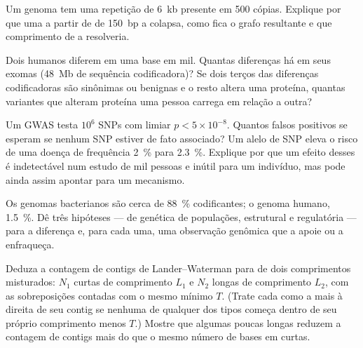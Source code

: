 \begin{exercise}[$\star\star$]\label{exo:b3:genomics:7}
Um genoma tem uma repetição de \qty{6}{kb} presente em \num{500}
cópias. Explique por que uma  a partir de  de
\qty{150}{bp} a colapsa, como fica o grafo resultante e que comprimento
de  a resolveria.
\end{exercise}

\begin{exercise}[$\star\star$]\label{exo:b3:genomics:8}
Dois humanos diferem em uma base em mil. Quantas diferenças há em seus
exomas (\qty{48}{Mb} de sequência codificadora)? Se dois terços das
diferenças codificadoras são sinônimas ou benignas e o resto altera
uma proteína, quantas variantes que alteram proteína uma pessoa
carrega em relação a outra?
\end{exercise}

\begin{exercise}[$\star\star$]\label{exo:b3:genomics:9}
Um GWAS testa $10^{6}$ SNPs com limiar $p < 5\times 10^{-8}$. Quantos
falsos positivos se esperam se nenhum SNP estiver de fato associado?
Um alelo de SNP eleva o risco de uma doença de frequência \qty{2}{\%}
para \qty{2.3}{\%}. Explique por que um efeito desses é indetectável
num estudo de mil pessoas e inútil para um indivíduo, mas pode ainda
assim apontar para um mecanismo.
\end{exercise}

\begin{exercise}[$\star\star\star$]\label{exo:b3:genomics:10}
Os genomas bacterianos são cerca de \qty{88}{\%} codificantes; o
genoma humano, \qty{1.5}{\%}. Dê três hipóteses --- de genética de
populações, estrutural e regulatória --- para a diferença e, para cada
uma, uma observação genômica que a apoie ou a enfraqueça.
\end{exercise}

\begin{exercise}[$\star\star\star$]\label{exo:b3:genomics:11}
Deduza a contagem de contigs de Lander--Waterman para  de dois
comprimentos misturados: $N_{1}$  curtas de comprimento
$L_{1}$ e $N_{2}$  longas de comprimento $L_{2}$, com as
sobreposições contadas com o mesmo mínimo $T$. (Trate cada 
como a mais à direita de seu contig se nenhuma  de qualquer dos
tipos começa dentro de seu próprio comprimento menos $T$.) Mostre que
algumas poucas  longas reduzem a contagem de contigs mais do
que o mesmo número de bases em  curtas.
\end{exercise}

